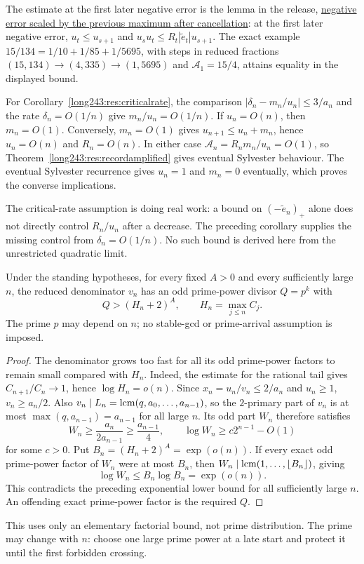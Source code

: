 \documentclass[11pt]{article}
\begin{document}
The estimate at the first later negative error is the lemma in the release,
\href{https://github.com/wcook04/plectis-erdos-lean/blob/52f29ad173b04e3bac941b3663f2b9aebe5de0bb/ErdosProblems/Erdos243/SaturatedSquareTransport.lean\#L378}{negative error scaled by the previous maximum after cancellation}: at the first later negative error,
$u_t\le u_{s+1}$ and $u_su_t\le R_t|\tilde e_t|u_{s+1}$. The exact example
$15/134=1/10+1/85+1/5695$, with steps in reduced fractions
$(15,134)\to(4,335)\to(1,5695)$ and $\mathcal A_1=15/4$,
attains equality in the displayed bound.

For Corollary~\ref{long243:res:criticalrate}, the comparison
$|\delta_n-m_n/u_n|\le3/a_n$ and the rate $\delta_n=O(1/n)$ give
$m_n/u_n=O(1/n)$. If $u_n=O(n)$, then $m_n=O(1)$. Conversely,
$m_n=O(1)$ gives $u_{n+1}\le u_n+m_n$, hence $u_n=O(n)$ and
$R_n=O(n)$. In either case
$\mathcal A_n=R_nm_n/u_n=O(1)$, so
Theorem~\ref{long243:res:recordamplified} gives eventual Sylvester
behaviour. The eventual Sylvester recurrence gives $u_n=1$ and $m_n=0$ eventually,
which proves the converse implications.

The critical-rate assumption is doing real work: a bound on
$(-\tilde e_n)_+$ alone does not directly control $R_n/u_n$ after a
decrease. The preceding corollary supplies the missing control from
$\delta_n=O(1/n)$. No such bound is derived here from the unrestricted
quadratic limit.

\begin{lemma}\label{long243:res:oddpowersupply}
Under the standing hypotheses, for every fixed $A>0$ and every sufficiently large $n$, the
reduced denominator $v_n$ has an odd prime-power divisor $Q=p^k$ with
\[
 Q>(H_n+2)^A,\qquad H_n=\max_{j\le n}C_j.
\]
The prime $p$ may depend on $n$; no stable-gcd or prime-arrival assumption
is imposed.
\end{lemma}
\begin{proof}
The denominator grows too fast for all its odd prime-power factors to
remain small compared with $H_n$. Indeed, the estimate for the rational
tail gives $C_{n+1}/C_n\to1$, hence $\log H_n=o(n)$. Since $x_n=u_n/v_n\le2/a_n$ and $u_n\ge1$,
$v_n\ge a_n/2$. Also $v_n\mid L_n=\operatorname{lcm}(q,a_0,\ldots,a_{n-1})$,
so the $2$-primary part of $v_n$ is at most $\max(q,a_{n-1})=a_{n-1}$
for all large $n$. Its odd part $W_n$ therefore satisfies
\[
 W_n\ge\frac{a_n}{2a_{n-1}}\ge\frac{a_{n-1}}4,
 \qquad \log W_n\ge c2^{n-1}-O(1)
\]
for some $c>0$.
Put $B_n=(H_n+2)^A=\exp(o(n))$. If every exact odd prime-power factor of
$W_n$ were at most $B_n$, then
$W_n\mid\operatorname{lcm}(1,\ldots,\lfloor B_n\rfloor)$, giving
\[
 \log W_n\le B_n\log B_n=\exp(o(n)).
\]
This contradicts the preceding exponential lower bound for all sufficiently
large $n$. An offending exact prime-power factor is the required $Q$.
\end{proof}
This uses only an elementary factorial bound, not prime distribution.
The prime may change with $n$: choose one large prime power at a late
start and protect it until the first forbidden crossing.
\end{document}
